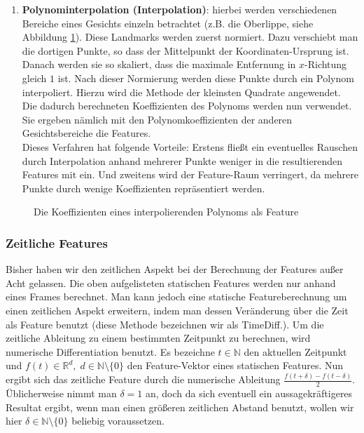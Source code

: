 \begin{enumerate}
      \item \textbf{Polynominterpolation (Interpolation)}:
     hierbei werden verschiedenen Bereiche eines Gesichts einzeln betrachtet (z.B. die Oberlippe, siehe Abbildung \ref{fig:interpol}).
     Diese Landmarks werden zuerst normiert. Dazu verschiebt man die dortigen Punkte, so dass der Mittelpunkt der Koordinaten-Ursprung ist. Danach werden sie so skaliert, dass die maximale Entfernung in $x$-Richtung gleich $1$ ist.
     Nach dieser Normierung werden diese Punkte durch ein Polynom interpoliert. Hierzu wird die Methode der kleinsten Quadrate angewendet. Die dadurch berechneten Koeffizienten des Polynoms werden nun verwendet. Sie ergeben nämlich mit den Polynomkoeffizienten der anderen Gesichtsbereiche die Features.\\
     Dieses Verfahren hat folgende Vorteile:
     Erstens fließt ein eventuelles Rauschen durch Interpolation anhand mehrerer Punkte  weniger in die resultierenden Features mit ein. Und zweitens wird der Feature-Raum verringert, da mehrere Punkte durch wenige Koeffizienten repräsentiert werden.
\end{enumerate}
\begin{figure}
  \center
\scalebox{ 0.9 }{

}
\caption{Die Koeffizienten eines interpolierenden Polynoms als Feature}
\label{fig:interpol}
\end{figure}

\subsubsection{Zeitliche Features}
Bisher haben wir den zeitlichen Aspekt bei der Berechnung der Features außer Acht gelassen. Die oben aufgelisteten statischen Features werden nur anhand eines Frames berechnet.
Man kann jedoch eine statische Featureberechnung um einen zeitlichen Aspekt erweitern, indem man dessen Veränderung über die Zeit als Feature benutzt (diese Methode bezeichnen wir als TimeDiff.).
Um die zeitliche Ableitung zu einem bestimmten Zeitpunkt zu berechnen, wird
numerische Differentiation benutzt. Es bezeichne $t\in\mathbb{N}$ den aktuellen Zeitpunkt und $f(t)\in\mathbb{R}^d,\;d\in\mathbb{N}\setminus\{0\}$ den Feature-Vektor eines statischen Features. Nun ergibt sich das zeitliche Feature durch die numerische Ableitung $\frac{f(t+\delta)-f(t-\delta)}{2}$. Üblicherweise nimmt man $\delta=1$ an, doch da sich eventuell ein aussagekräftigeres Resultat ergibt, wenn man einen größeren zeitlichen Abstand benutzt, wollen wir hier $\delta\in\mathbb{N}\setminus\{0\}$  beliebig voraussetzen.

